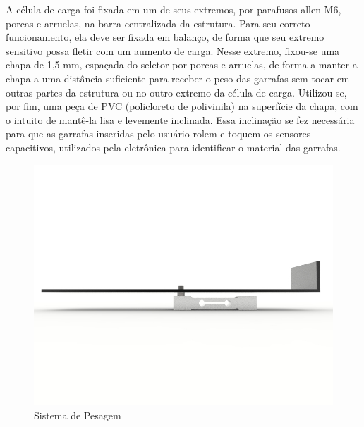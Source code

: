 A célula de carga foi fixada em um de seus extremos, por parafusos allen M6, porcas e arruelas, na barra centralizada da estrutura. Para seu correto funcionamento, ela deve ser fixada em balanço, de forma que seu extremo sensitivo possa fletir com um aumento de carga. Nesse extremo, fixou-se uma chapa de 1,5 mm, espaçada do seletor por porcas e arruelas, de forma a manter a chapa a uma distância suficiente para receber o peso das garrafas sem tocar em outras partes da estrutura ou no outro extremo da célula de carga. Utilizou-se, por fim, uma peça de PVC (policloreto de polivinila) na superfície da chapa, com o intuito de mantê-la lisa e levemente inclinada. Essa inclinação se fez necessária para que as garrafas inseridas pelo usuário rolem e toquem os sensores capacitivos, utilizados pela eletrônica para identificar o material das garrafas.

\begin{figure}[!h]
	\centering
		\includegraphics[scale=0.3]{figuras/estrutura/3-Sistema-de-pesagem1.jpg}
	\caption{Sistema de Pesagem}
\end{figure}

